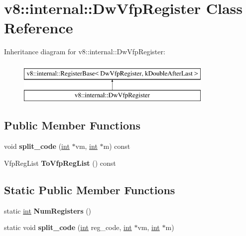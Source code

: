 \hypertarget{classv8_1_1internal_1_1DwVfpRegister}{}\section{v8\+:\+:internal\+:\+:Dw\+Vfp\+Register Class Reference}
\label{classv8_1_1internal_1_1DwVfpRegister}
Inheritance diagram for v8\+:\+:internal\+:\+:Dw\+Vfp\+Register\+:\begin{figure}[H]
\begin{center}
\leavevmode
\includegraphics[height=2.000000cm]{classv8_1_1internal_1_1DwVfpRegister}
\end{center}
\end{figure}
\subsection*{Public Member Functions}
\begin{DoxyCompactItemize}
\item 
\mbox{\label{classv8_1_1internal_1_1DwVfpRegister_a6af00b113571c484d11347a7743534a5}} 
void {\bfseries split\+\_\+code} (\mbox{\hyperlink{classint}{int}} $\ast$vm, \mbox{\hyperlink{classint}{int}} $\ast$m) const
\item 
\mbox{\label{classv8_1_1internal_1_1DwVfpRegister_ae5e227f9d8efff874708e28dc45e5d20}} 
Vfp\+Reg\+List {\bfseries To\+Vfp\+Reg\+List} () const
\end{DoxyCompactItemize}
\subsection*{Static Public Member Functions}
\begin{DoxyCompactItemize}
\item 
\mbox{\label{classv8_1_1internal_1_1DwVfpRegister_a481393b55d39b451b6cf630c0276d1a1}} 
static \mbox{\hyperlink{classint}{int}} {\bfseries Num\+Registers} ()
\item 
\mbox{\label{classv8_1_1internal_1_1DwVfpRegister_a25d2c6dd89b47203fb944a9287d0ed7f}} 
static void {\bfseries split\+\_\+code} (\mbox{\hyperlink{classint}{int}} reg\+\_\+code, \mbox{\hyperlink{classint}{int}} $\ast$vm, \mbox{\hyperlink{classint}{int}} $\ast$m)
\end{DoxyCompactItemize}
